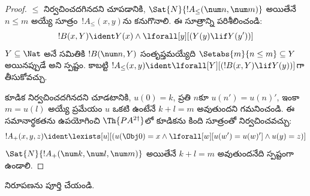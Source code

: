 \documentclass[../../../include/open-logic-section]{subfiles}
\begin{document}
\begin{proof}
$\le$ నిర్వచించదగినదని చూపడానికి, $\Sat{N}{!A_\le(\num n, \num m)}$
అయితేనే $n \le m$ అయ్యే సూత్రం~$!A_\le(x, y)$ను కనుగొనాలి. ఈ
సూత్రాన్ని పరిశీలించండి:
\[
!B(x, Y) \ident Y(x) \land \lforall[y][(Y(y) \lif Y(y'))]
\]
$Y \subseteq \Nat$ అనే సమితికి $!B(\num n, Y)$ సంతృప్తమయ్యేది
$\Setabs{m}{n \le m} \subseteq Y$ అయినప్పుడే అని స్పష్టం. కాబట్టి
$!A_\le(x, y) \ident \lforall[Y][(!B(x, Y) \lif Y(y))]$గా తీసుకోవచ్చు.

కూడిక నిర్వచించదగినదని చూడటానికి, $u(0)=k$, ప్రతి $n$కూ
$u(n')=u(n)'$, ఇంకా $m = u(l)$ అయ్యే ప్రమేయం $u$ ఒకటి ఉంటేనే
$k+l=m$ అవుతుందని గమనించండి. ఈ సమానార్థకతను ఉపయోగించి
$\Th{PA^{2\dagger}}$లో కూడికను కింది సూత్రంతో నిర్వచించవచ్చు:
\[
!A_+(x,y,z) \ident \lexists[u][(u(\Obj 0)=x \land \lforall[w][u(w')=u
 (w)'] \land u(y)=z)]
\]
$\Sat{N}{!A_+(\num k, \num l, \num m)}$ అయితేనే $k+l=m$
అవుతుందనేది స్పష్టంగా ఉండాలి.
\end{proof}

\begin{prob}
 నిరూపణను పూర్తి చేయండి.
\end{prob}
\end{document}

